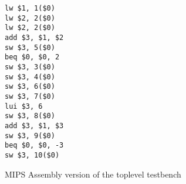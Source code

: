 \begin{figure}[h]
\begin{verbatim}
lw $1, 1($0)
lw $2, 2($0)
lw $2, 2($0)
add $3, $1, $2
sw $3, 5($0)
beq $0, $0, 2
sw $3, 3($0)
sw $3, 4($0)
sw $3, 6($0)
sw $3, 7($0)
lui $3, 6
sw $3, 8($0)
add $3, $1, $3
sw $3, 9($0)
beq $0, $0, -3
sw $3, 10($0)
\end{verbatim}
\caption{MIPS Assembly version of the toplevel testbench}
\end{figure}
